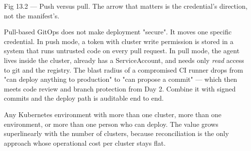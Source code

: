 \begin{wbfigure}{Fig 13.2 — Push versus pull. The arrow that matters is the credential's direction, not the manifest's.}
\end{wbfigure}

\begin{secwarn}
Pull-based GitOps does not make deployment "secure". It moves one specific credential. In push mode, a token with cluster write permission is stored in a system that runs untrusted code on every pull request. In pull mode, the agent lives inside the cluster, already has a ServiceAccount, and needs only \emph{read} access to git and the registry. The blast radius of a compromised CI runner drops from "can deploy anything to production" to "can propose a commit" --- which then meets code review and branch protection from Day 2. Combine it with signed commits and the deploy path is auditable end to end.
\end{secwarn}

 Any Kubernetes environment with more than one cluster, more than one environment, or more than one person who can deploy. The value grows superlinearly with the number of clusters, because reconciliation is the only approach whose operational cost per cluster stays flat.


